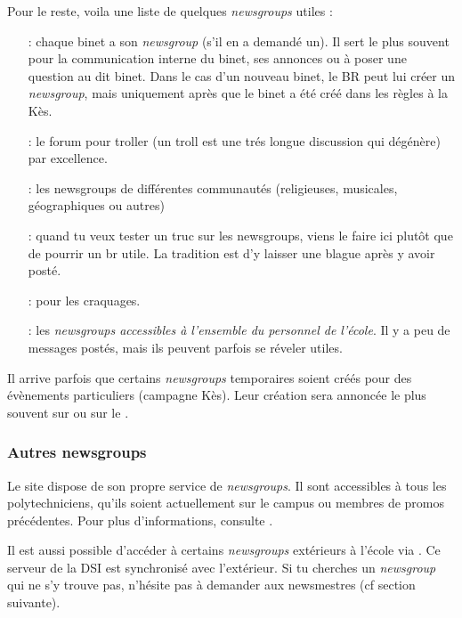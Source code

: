 \bigskip

Pour le reste, voila une liste de quelques \emph{newsgroups} utiles :
\begin{itemize}
\item[\ngname{br.binet.ton\_binet} :] chaque binet a son \emph{newsgroup} (s'il en a demandé un). Il sert le plus souvent pour la communication interne du binet, ses annonces ou à poser une question au dit binet. Dans le cas d'un nouveau binet, le BR peut lui créer un \emph{newsgroup}, mais uniquement après que le binet a été créé dans les règles à la Kès.

\item[\ngname{br.binet.polemix} :] le forum pour troller (un troll est une trés longue discussion qui dégénère) par excellence.
                          
\item[\ngname{br.communauté.*} :] les newsgroups de différentes communautés (religieuses, musicales, géographiques ou autres)

\item[\ngname{br.test} :] quand tu veux tester un truc sur les newsgroups, viens le faire ici plutôt que de pourrir un br utile. La tradition est  d'y laisser une blague après y avoir posté.

 \item[\ngname{br.trash} :] pour les craquages.
 
 \item[\ngname{public.*} :] les \emph{newsgroups accessibles à l'ensemble du personnel de l'école}.
                   Il y a peu de messages postés, mais ils peuvent parfois se réveler utiles.
\end{itemize}

\bigskip 
Il arrive parfois que certains \emph{newsgroups} temporaires soient créés pour des évènements particuliers (campagne Kès). Leur création sera annoncée
le plus souvent sur \fkz ou sur le .

\subsubsection{Autres newsgroups}
Le site  dispose de son propre service de \emph{newsgroups}. Il sont
accessibles à tous les polytechniciens, qu'ils soient actuellement sur le campus ou membres de
promos précédentes. Pour plus d'informations, consulte .

Il est aussi possible d'accéder à certains \emph{newsgroups} extérieurs à l'école via . Ce serveur de la DSI est synchronisé avec
l'extérieur. Si tu cherches un \emph{newsgroup} qui ne s'y trouve pas, n'hésite pas à demander aux newsmestres (cf section suivante).

